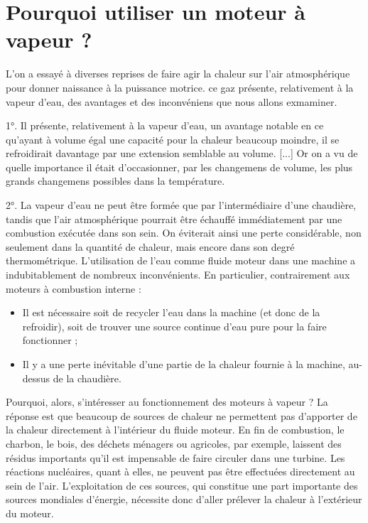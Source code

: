 \section{Pourquoi utiliser un moteur à vapeur ?}

		L’on a essayé à diverses reprises de faire agir la chaleur sur l’air atmosphérique pour donner naissance à la puissance motrice. ce gaz présente, relativement à la vapeur d’eau, des avantages et des inconvéniens que nous allons exmaminer.
		
	1°. Il présente, relativement à la vapeur d’eau, un avantage notable en ce qu’ayant à volume égal une capacité pour la chaleur beaucoup moindre, il se refroidirait davantage par une extension semblable au volume. [...] Or on a vu de quelle importance il était d’occasionner, par les changemens de volume, les plus grands changemens possibles dans la température.
	
	2°. La vapeur d’eau ne peut être formée que par l’intermédiaire d’une chaudière, tandis que l’air atmosphérique pourrait être échauffé immédiatement par une combustion exécutée dans son sein. On éviterait ainsi une perte considérable, non seulement dans la quantité de chaleur, mais encore dans son degré thermométrique.
	L’utilisation de l’eau comme fluide moteur dans une machine a indubitablement de nombreux inconvénients. En particulier, contrairement aux moteurs à combustion interne :
	\begin{itemize}
		\item Il est nécessaire soit de recycler l’eau dans la machine (et donc de la refroidir), soit de trouver une source continue d’eau pure pour la faire fonctionner ;
		\item Il y a une perte inévitable d’une partie de la chaleur fournie à la machine, au-dessus de la chaudière.
	\end{itemize}

	Pourquoi, alors, s’intéresser au fonctionnement des moteurs à vapeur ? La réponse est que beaucoup de sources de chaleur ne permettent pas d’apporter de la chaleur directement à l’intérieur du fluide moteur. En fin de combustion, le charbon, le bois, des déchets ménagers ou agricoles, par exemple, laissent des résidus importants qu’il est impensable de faire circuler dans une turbine. Les réactions nucléaires, quant à elles, ne peuvent pas être effectuées directement au sein de l’air. L’exploitation de ces sources, qui constitue une part importante des sources mondiales d’énergie, nécessite donc d’aller prélever la chaleur à l’extérieur du moteur.

